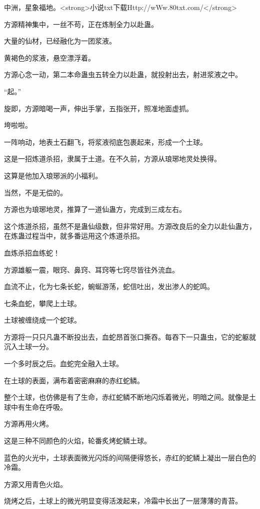 
\begin{this_body}

中洲，星象福地。<strong>小说txt下载Http://wWw.80txt.com/</strong>

方源精神集中，一丝不苟，正在炼制全力以赴蛊。

大量的仙材，已经融化为一团浆液。

黄褐色的浆液，悬空漂浮着。

方源心念一动，第二本命蛊虫五转全力以赴蛊，就投射出去，射进浆液之中。

“起。”

旋即，方源暗喝一声，伸出手掌，五指张开，照准地面虚抓。

垮啦啦。

一阵响动，地表土石翻飞，将浆液彻底包裹起来，形成一个土球。

这是一招炼道杀招，隶属于土道。在不久前，方源从琅琊地灵处换得。

这算是他加入琅琊派的小福利。

当然，不是无偿的。

方源也为琅琊地灵，推算了一道仙蛊方，完成到三成左右。

这个炼道杀招，虽然不是蛊仙级数，但非常好用。方源改良后的全力以赴仙蛊方，在炼蛊过程当中，就多番运用这个炼道杀招。

血炼杀招血练蛇！

方源雄躯一震，眼窍、鼻窍、耳窍等七窍尽皆往外流血。

血流不止，化为七条长蛇，蜿蜒游荡，蛇信吐出，发出渗人的蛇鸣。

七条血蛇，攀爬上土球。

土球被缠绕成一个蛇球。

方源将一只只凡蛊不断投出去，血蛇昂首张口撕吞。每吞下一只蛊虫，它的蛇躯就沉入土球一分。

一个多时辰之后。血蛇完全融入土球。

在土球的表面，满布着密密麻麻的赤红蛇鳞。

整个土球，也仿佛是有了生命，赤红蛇鳞不断地闪烁着微光，明暗之间。就像是土球中有生命在呼吸。

方源再用火烤。

这是三种不同颜色的火焰，轮番炙烤蛇鳞土球。

蓝色的火光中，土球表面微光闪烁的间隔便得悠长，赤红的蛇鳞上凝出一层白色的冷霜。

方源又用青色火焰。

烧烤之后，土球上的微光明显变得活泼起来，冷霜中长出了一层薄薄的青苔。


\end{this_body}

